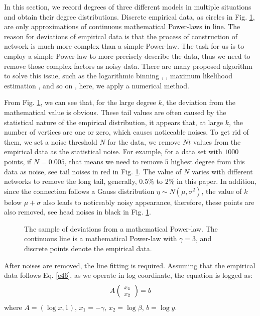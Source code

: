 \documentclass[final]{IEEEtran}
\begin{document}
In this section, we record degrees of three different models in
multiple situations and obtain their degree distributions.
Discrete empirical data, as circles in Fig. \ref{f8}, are only
approximations of continuous mathematical Power-laws in line. The
reason for deviations of empirical data is that the process of
construction of network is much more complex than a simple
Power-law. The task for us is to employ a simple Power-law to more
precisely describe the data, thus we need to remove those complex
factors as noisy data. There are many proposed algorithm to solve
this issue, such as the logarithmic binning \cite{jeong1},
\cite{sta}, maximum likelihood estimation \cite{h}, \cite{aa} and
so on \cite{vi}, here, we apply a numerical method.


From Fig. \ref{f8}, we can see that, for the large degree $k$, the
deviation from the mathematical value is obvious. These tail
values are often caused by the statistical nature of the empirical
distribution, it appears that, at large $k$, the number of
vertices are one or zero, which causes noticeable noises. To get
rid of them, we set a noise threshold $N$ for the data, we remove
$Nt$ values from the empirical data as the statistical noise. For
example, for a data set with $1000$ points, if $N=0.005$, that
means we need to remove $5$ highest degree from this data as
noise, see tail noises in red in Fig. \ref{f8}. The value of $N$
varies with different networks to remove the long tail, generally,
$0.5\%$ to $2\%$ in this paper. In addition, since the connection
follows a Gauss distribution $\eta \sim N(\mu, \sigma^{2})$, the
value of $k$ below $\mu+\sigma$ also leads to noticeably noisy
appearance, therefore, these points are also removed, see head
noises in black in Fig. \ref{f8}.
\begin{figure}[!htp]
\centering
\caption{\label{f8} The sample of deviations from a mathematical
Power-law. The continuous line is a mathematical Power-law with
$\gamma =3$, and discrete points denote the empirical data.}
\end{figure}



After noises are removed, the line fitting is required. Assuming
that the empirical data follows Eq. \ref{e46}, as we operate in
log coordinate, the equation is logged as:
\begin{equation}\label{e47}\footnotesize
A\left(
\begin{array}{p{0.35cm}<{\centering}p{0.35cm}<{\centering}}
 $x_{1}$\\
 $ x_{2}$\\
   \end{array}
\right)=b
\end{equation}
where $A$$=$$(\log x, 1)$, $x_{1}$$=$$-\gamma$, $x_{2}$$=$$\log
\beta$, $b$$=$$\log y$.
\end{document}

